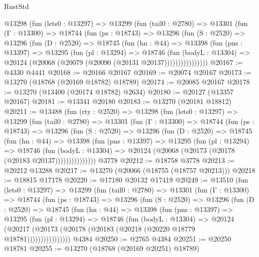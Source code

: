 \begin{lexlean}{RustStd}
\begin{coremodule}
      @13298
        (fun (lets0 : @13297) =>
        @13299
          (fun (tail0 : @2780) =>
          @13301
            (fun (Γ : @13300) =>
            @18744
              (fun (ps : @18743) =>
              @13296
                (fun (S : @2520) =>
                @13296
                  (fun (D : @2520) =>
                  @18745
                    (fun (hn : @44) =>
                    @13398
                      (fun (pns : @13397) =>
                      @13295
                        (fun (pl : @13294) =>
                        @18746
                          (fun (bodyL : @13304) =>
                          @20124 (@20068 (@20079 (@20090 (@20131 @20137))))))))))))))))
@20167 := @4330 @4441
@20168 := @20166 @20167
@20169 := @20074 @20167
@20173 := @13270 (@18768 (@20169 @18782) @18789)
@20174 := @20085 @20167
@20178 := @13270 (@13400 (@20174 @18782) @2634)
@20180 := @20127 (@13357 @20167)
@20181 := @13341 @20180
@20183 := @13270 (@20181 @18812)
@20211 := @13488
    (fun (rty : @2520) =>
    @13298
      (fun (lets0 : @13297) =>
      @13299
        (fun (tail0 : @2780) =>
        @13301
          (fun (Γ : @13300) =>
          @18744
            (fun (ps : @18743) =>
            @13296
              (fun (S : @2520) =>
              @13296
                (fun (D : @2520) =>
                @18745
                  (fun (hn : @44) =>
                  @13398
                    (fun (pns : @13397) =>
                    @13295
                      (fun (pl : @13294) =>
                      @18746
                        (fun (bodyL : @13304) =>
                        @20124 (@20068 (@20173 (@20178 (@20183 @20137)))))))))))))))
    @3778
@20212 := @18758 @3778
@20213 := @20212 @13288
@20217 := @13270 (@20066 (@18755 (@18757 @20213)))
@20218 := @18815 @17178
@20220 := @17180 @20132 @17419
@20249 := @13510
    (fun (lets0 : @13297) =>
    @13299
      (fun (tail0 : @2780) =>
      @13301
        (fun (Γ : @13300) =>
        @18744
          (fun (ps : @18743) =>
          @13296
            (fun (S : @2520) =>
            @13296
              (fun (D : @2520) =>
              @18745
                (fun (hn : @44) =>
                @13398
                  (fun (pns : @13397) =>
                  @13295
                    (fun (pl : @13294) =>
                    @18746
                      (fun (bodyL : @13304) =>
                      @20124
                        (@20217
                          (@20173 (@20178 (@20183 (@20218 (@20220 @18779 @18781))))))))))))))))
    @4384
@20250 := @2765 @4384
@20251 := @20250 @18781
@20255 := @13270 (@18768 (@20169 @20251) @18789)

\end{coremodule}
\end{lexlean}
